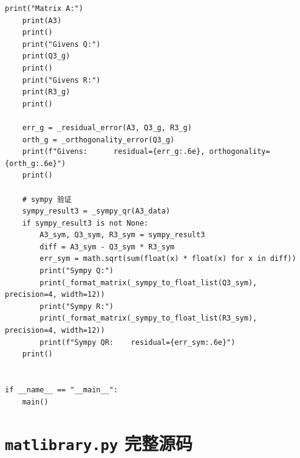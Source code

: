 \documentclass[UTF8,zihao=-4]{ctexart}
\begin{document}
\begin{lstlisting}[style=pycodestyle,caption={main.py 完整源码}]
    print("Matrix A:")
    print(A3)
    print()
    print("Givens Q:")
    print(Q3_g)
    print()
    print("Givens R:")
    print(R3_g)
    print()

    err_g = _residual_error(A3, Q3_g, R3_g)
    orth_g = _orthogonality_error(Q3_g)
    print(f"Givens:      residual={err_g:.6e}, orthogonality={orth_g:.6e}")
    print()

    # sympy 验证
    sympy_result3 = _sympy_qr(A3_data)
    if sympy_result3 is not None:
        A3_sym, Q3_sym, R3_sym = sympy_result3
        diff = A3_sym - Q3_sym * R3_sym
        err_sym = math.sqrt(sum(float(x) * float(x) for x in diff))
        print("Sympy Q:")
        print(_format_matrix(_sympy_to_float_list(Q3_sym), precision=4, width=12))
        print("Sympy R:")
        print(_format_matrix(_sympy_to_float_list(R3_sym), precision=4, width=12))
        print(f"Sympy QR:    residual={err_sym:.6e}")
    print()


if __name__ == "__main__":
    main()
\end{lstlisting}

\section{\texttt{matlibrary.py} 完整源码}
\end{document}
